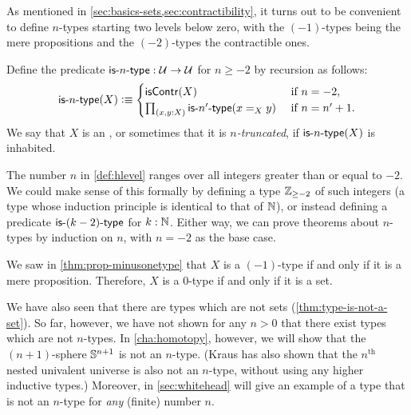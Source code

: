 As mentioned in \autoref{sec:basics-sets,sec:contractibility}, it turns out to be convenient to define $n$-types starting two levels below zero, with the $(-1)$-types being the mere propositions and the $(-2)$-types the contractible ones.

\begin{defn}\label{def:hlevel}
  Define the predicate $\mathsf{is}\mbox{-}{n}\mbox{-}\mathsf{type} : \mathcal{U} \to \mathcal{U}$ for $n \geq -2$ by recursion as follows:
  \[ \istype{n}(X) \defeq
  \begin{cases}
    \iscontr(X) & \text{ if } n = -2, \\
    \prd{x,y : X} \istype{n'}(\id[X]{x}{y}) & \text{ if } n = n'+1.
  \end{cases}
  \]
  We say that $X$ is an , or sometimes that it is \emph{$n$-truncated},
 if $\mathsf{is}\mbox{-}{n}\mbox{-}\mathsf{type}(X)$ is inhabited.
\end{defn}

\begin{rmk}
  The number $n$ in \autoref{def:hlevel} ranges over all integers greater than or equal to $-2$.
  We could make sense of this formally by defining a type $\mathbb{Z}_{{\geq}-2}$ of such integers (a type whose induction principle is identical to that of $\mathbb{N}$), or instead defining a predicate $\mathsf{is}\mbox{-}{(k-2)}\mbox{-}\mathsf{type}$ for $k : \mathbb{N}$.
  Either way, we can prove theorems about $n$-types by induction on $n$, with $n = -2$ as the base case.
\end{rmk}

\begin{eg}
  We saw in \autoref{thm:prop-minusonetype} that $X$ is a $(-1)$-type if and only if it is a mere proposition.
  Therefore, $X$ is a $0$-type if and only if it is a set.
\end{eg}

We have also seen that there are types which are not sets (\autoref{thm:type-is-not-a-set}).
So far, however, we have not shown for any $n>0$ that there exist types which are not $n$-types.
In \autoref{cha:homotopy}, however, we will show that the $(n+1)$-sphere $\mathbb{S}^{n+1}$ is not an $n$-type.
(Kraus has also shown that the $n^{\mathrm{th}}$ nested univalent universe is also not an $n$-type, without using any higher inductive types.)
Moreover, in \autoref{sec:whitehead} will give an example of a type that is not an $n$-type for \emph{any} (finite) number $n$.

